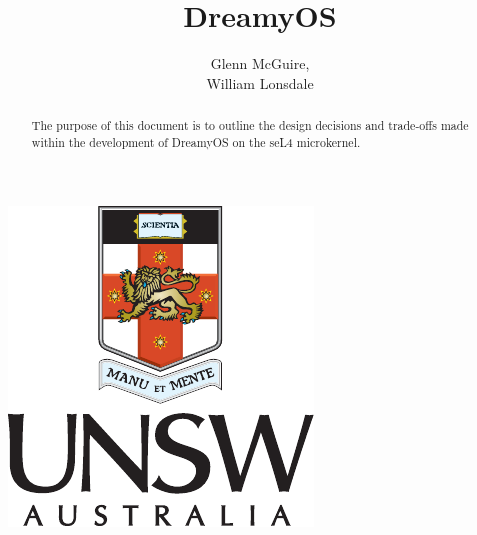 \documentclass[runningheads,a4paper]{llncs}
\begin{document}
\begin{minipage}{\textwidth}

\begin{center}
\includegraphics[scale=1]{crest}
\end{center}

\medskip
\medskip

\title{DreamyOS}
\author{Glenn McGuire,\\ William Lonsdale}
\tocauthor{{}}
\maketitle

\begin{abstract}
The purpose of this document is to outline the design decisions and trade-offs made within the development of DreamyOS on the seL4 microkernel. 
\end{abstract}

\end{minipage}


 
\setcounter{secnumdepth}{6}
 
\newpage
{}  

\medskip

\begingroup
\let\clearpage\relax
\tableofcontents
\endgroup

\medskip
\medskip
\end{document}
